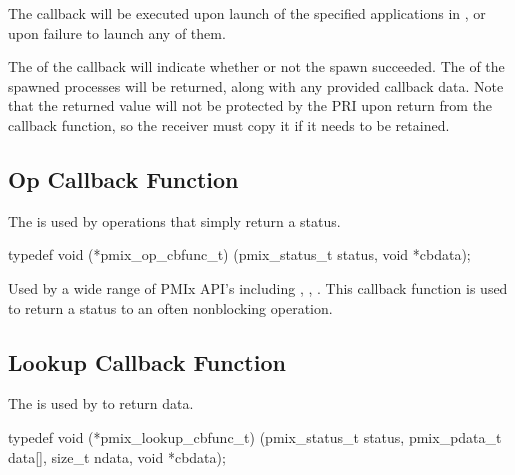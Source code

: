 \descr

The callback will be executed upon launch of the specified applications in , or upon failure to launch any of them.

The  of the callback will indicate whether or not the spawn succeeded.
The  of the spawned processes will be returned, along with any provided callback data.
Note that the returned  value will not be protected by the \ac{PRI} upon return from the callback function, so the receiver must copy it if it needs to be retained.


\subsection{Op Callback Function}

\summary

The  is used by operations that simply return a status.

\cspecificstart
\begin{codepar}
typedef void (*pmix_op_cbfunc_t)
    (pmix_status_t status, void *cbdata);
\end{codepar}
\cspecificend

\begin{arglist}
\end{arglist}

\descr

Used by a wide range of \ac{PMIx} API's including , , .
This callback function is used to return a status to an often nonblocking operation.


\subsection{Lookup Callback Function}

\summary

The  is used by  to return data.

\cspecificstart
\begin{codepar}
typedef void (*pmix_lookup_cbfunc_t)
    (pmix_status_t status,
     pmix_pdata_t data[], size_t ndata,
     void *cbdata);
\end{codepar}
\cspecificend


